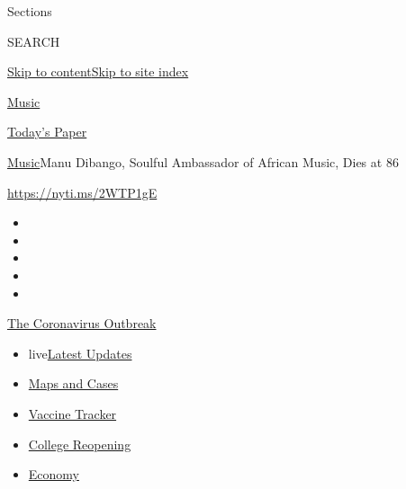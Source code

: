 Sections

SEARCH

\protect\hyperlink{site-content}{Skip to
content}\protect\hyperlink{site-index}{Skip to site index}

\href{https://www.nytimes.com/section/arts/music}{Music}

\href{https://myaccount.nytimes.com/auth/login?response_type=cookie\&client_id=vi}{}

\href{https://www.nytimes.com/section/todayspaper}{Today's Paper}

\href{/section/arts/music}{Music}\textbar{}Manu Dibango, Soulful
Ambassador of African Music, Dies at 86

\url{https://nyti.ms/2WTP1gE}

\begin{itemize}
\item
\item
\item
\item
\item
\end{itemize}

\href{https://www.nytimes.com/news-event/coronavirus?action=click\&pgtype=Article\&state=default\&region=TOP_BANNER\&context=storylines_menu}{The
Coronavirus Outbreak}

\begin{itemize}
\tightlist
\item
  live\href{https://www.nytimes.com/2020/08/03/world/coronavirus-covid-19.html?action=click\&pgtype=Article\&state=default\&region=TOP_BANNER\&context=storylines_menu}{Latest
  Updates}
\item
  \href{https://www.nytimes.com/interactive/2020/us/coronavirus-us-cases.html?action=click\&pgtype=Article\&state=default\&region=TOP_BANNER\&context=storylines_menu}{Maps
  and Cases}
\item
  \href{https://www.nytimes.com/interactive/2020/science/coronavirus-vaccine-tracker.html?action=click\&pgtype=Article\&state=default\&region=TOP_BANNER\&context=storylines_menu}{Vaccine
  Tracker}
\item
  \href{https://www.nytimes.com/2020/08/02/us/covid-college-reopening.html?action=click\&pgtype=Article\&state=default\&region=TOP_BANNER\&context=storylines_menu}{College
  Reopening}
\item
  \href{https://www.nytimes.com/live/2020/08/03/business/stock-market-today-coronavirus?action=click\&pgtype=Article\&state=default\&region=TOP_BANNER\&context=storylines_menu}{Economy}
\end{itemize}

